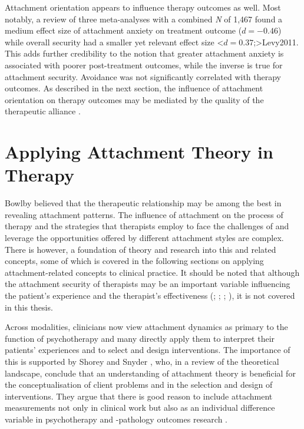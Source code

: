 \documentclass[12pt]{report}
\begin{document}
Attachment orientation appears to influence therapy outcomes as well.
Most notably, a review of three meta-analyses with a combined \textit{N} of 1,467 found a medium effect size of attachment anxiety on treatment outcome ($d=-0.46$) while overall security had a smaller yet relevant effect size \shortcite<$d=0.37$;>{Levy2011}.
This adds further credibility to the notion that greater attachment anxiety is associated with poorer post-treatment outcomes, while the inverse is true for attachment security.
Avoidance was not significantly correlated with therapy outcomes.
As described in the next section, the influence of attachment orientation on therapy outcomes may be mediated by the quality of the therapeutic alliance .

\section{Applying Attachment Theory in Therapy}
\label{sec:Applying attachment in therapy}
Bowlby \citeyear{Bowlby1988} believed that the therapeutic relationship may be among the best in revealing attachment patterns.
The influence of attachment on the process of therapy and the strategies that therapists employ to face the challenges of and leverage the opportunities offered by different attachment styles are complex.
There is however, a foundation of theory and research into this and related concepts, some of which is covered in the following sections on applying attachment-related concepts to clinical practice.
It should be noted that although the attachment security of therapists may be an important variable influencing the patient's experience and the therapist's effectiveness (; ; ; ), it is not covered in this thesis.

Across modalities, clinicians now view attachment dynamics as primary to the function of psychotherapy and many directly apply them to interpret their patients' experiences and to select and design interventions.
The importance of this is supported by Shorey and Snyder \citeyear{Shorey2006}, who, in a review of the theoretical landscape, conclude that an understanding of attachment theory is beneficial for the conceptualisation of client problems and in the selection and design of interventions.
They argue that there is good reason to include attachment measurements not only in clinical work but also as an individual difference variable in psychotherapy and -pathology outcomes research \cite{Shorey2006}.
\end{document}
